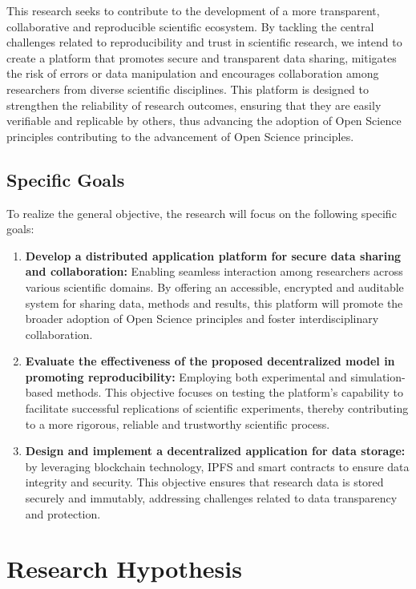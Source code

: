 \documentclass{article}
\begin{document}
This research seeks to contribute to the development of a more transparent, collaborative and reproducible scientific ecosystem. By tackling the central challenges related to reproducibility and trust in scientific research, we intend to create a platform that promotes secure and transparent data sharing, mitigates the risk of errors or data manipulation and encourages collaboration among researchers from diverse scientific disciplines. This platform is designed to strengthen the reliability of research outcomes, ensuring that they are easily verifiable and replicable by others, thus advancing the adoption of Open Science principles contributing to the advancement of Open Science principles.

\subsection{Specific Goals}

To realize the general objective, the research will focus on the following specific goals:

\begin{enumerate}
    \item \textbf{Develop a distributed application platform for secure data sharing and collaboration:} Enabling seamless interaction among researchers across various scientific domains. By offering an accessible, encrypted and auditable system for sharing data, methods and results, this platform will promote the broader adoption of Open Science principles and foster interdisciplinary collaboration.

    \item \textbf{Evaluate the effectiveness of the proposed decentralized model in promoting reproducibility:} Employing both experimental and simulation-based methods. This objective focuses on testing the platform's capability to facilitate successful replications of scientific experiments, thereby contributing to a more rigorous, reliable and trustworthy scientific process.

    \item \textbf{Design and implement a decentralized application for data storage:} by leveraging blockchain technology, IPFS and smart contracts to ensure data integrity and security. This objective ensures that research data is stored securely and immutably, addressing challenges related to data transparency and protection.
\end{enumerate}

\section{Research Hypothesis}
\end{document}
